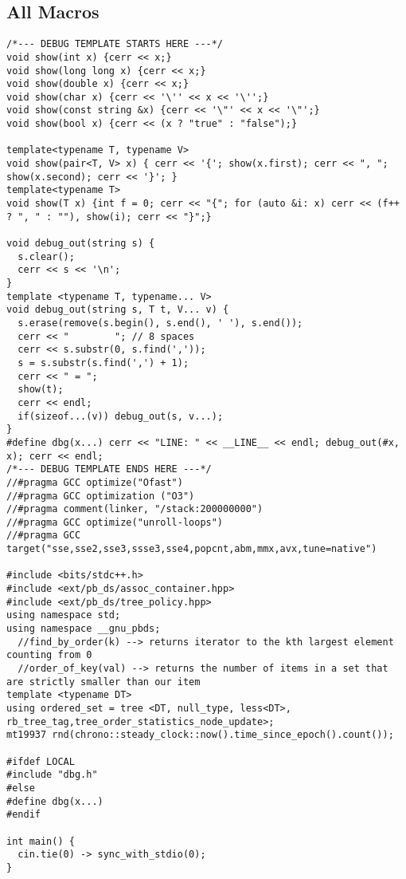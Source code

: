 \documentclass[FSZ,a4paper,onesided]{article}
\begin{document}
\begin{multicols*}{\COLS}
\tableofcontents
\newpage
{}


\section{All Macros}
\begin{lstlisting}
/*--- DEBUG TEMPLATE STARTS HERE ---*/
void show(int x) {cerr << x;}
void show(long long x) {cerr << x;}
void show(double x) {cerr << x;}
void show(char x) {cerr << '\'' << x << '\'';}
void show(const string &x) {cerr << '\"' << x << '\"';}
void show(bool x) {cerr << (x ? "true" : "false");}

template<typename T, typename V>
void show(pair<T, V> x) { cerr << '{'; show(x.first); cerr << ", "; show(x.second); cerr << '}'; }
template<typename T>
void show(T x) {int f = 0; cerr << "{"; for (auto &i: x) cerr << (f++ ? ", " : ""), show(i); cerr << "}";}

void debug_out(string s) {
  s.clear();
  cerr << s << '\n';
}
template <typename T, typename... V>
void debug_out(string s, T t, V... v) {
  s.erase(remove(s.begin(), s.end(), ' '), s.end());
  cerr << "        "; // 8 spaces
  cerr << s.substr(0, s.find(','));
  s = s.substr(s.find(',') + 1);
  cerr << " = ";
  show(t);
  cerr << endl;
  if(sizeof...(v)) debug_out(s, v...);
}
#define dbg(x...) cerr << "LINE: " << __LINE__ << endl; debug_out(#x, x); cerr << endl; 
/*--- DEBUG TEMPLATE ENDS HERE ---*/
//#pragma GCC optimize("Ofast")
//#pragma GCC optimization ("O3")
//#pragma comment(linker, "/stack:200000000")
//#pragma GCC optimize("unroll-loops")
//#pragma GCC target("sse,sse2,sse3,ssse3,sse4,popcnt,abm,mmx,avx,tune=native")

#include <bits/stdc++.h>
#include <ext/pb_ds/assoc_container.hpp>
#include <ext/pb_ds/tree_policy.hpp>
using namespace std;
using namespace __gnu_pbds;
  //find_by_order(k) --> returns iterator to the kth largest element counting from 0
  //order_of_key(val) --> returns the number of items in a set that are strictly smaller than our item
template <typename DT> 
using ordered_set = tree <DT, null_type, less<DT>, rb_tree_tag,tree_order_statistics_node_update>;
mt19937 rnd(chrono::steady_clock::now().time_since_epoch().count());

#ifdef LOCAL
#include "dbg.h"
#else
#define dbg(x...)
#endif

int main() {
  cin.tie(0) -> sync_with_stdio(0);
}
\end{lstlisting}

\end{multicols*}
\end{document}
